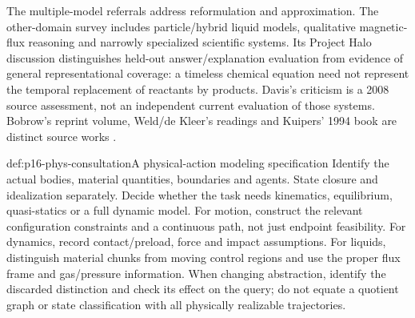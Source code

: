 The multiple-model referrals address reformulation and approximation.
The other-domain survey includes particle/hybrid liquid models, qualitative
magnetic-flux reasoning and narrowly specialized scientific systems.
Its Project Halo discussion distinguishes held-out answer/explanation
evaluation from evidence of general representational coverage: a timeless
chemical equation need not represent the temporal replacement of reactants
by products. Davis's criticism is a 2008 source assessment, not an independent
current evaluation of those systems. Bobrow's reprint volume, Weld/de Kleer's
readings and Kuipers' 1994 book are distinct source works
\cite[pp.~616--620]{Davis2008PhysicalReasoning}.

\begin{hbmethod}{def:p16-phys-consultation}{A physical-action modeling specification}
Identify the actual bodies, material quantities, boundaries and agents.
State closure and idealization separately. Decide whether the task needs
kinematics, equilibrium, quasi-statics or a full dynamic model. For motion,
construct the relevant configuration constraints and a continuous path, not
just endpoint feasibility. For dynamics, record contact/preload, force and
impact assumptions. For liquids, distinguish material chunks from moving
control regions and use the proper flux frame and gas/pressure information.
When changing abstraction, identify the discarded distinction and check its
effect on the query; do not equate a quotient graph or state classification
with all physically realizable trajectories.
\end{hbmethod}

